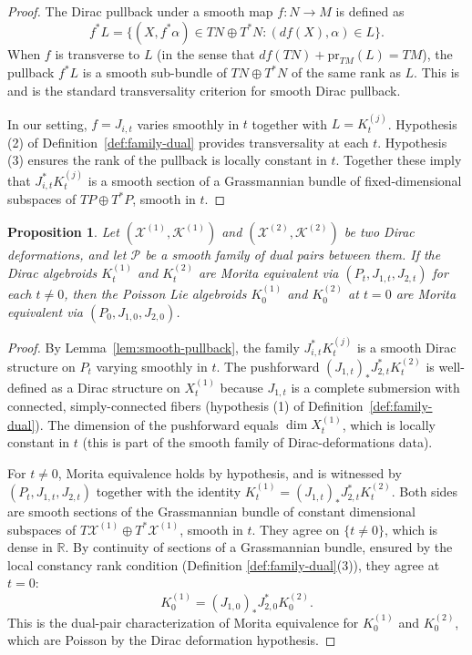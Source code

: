 \documentclass[reqno]{amsart}
\theoremstyle{plain}
\newtheorem{Prop}[Thm]{Proposition}
\theoremstyle{definition}
\newcommand{\R}{\mathbb{R}}
\newcommand{\X}{\mathcal{X}}
\newcommand{\K}{\mathcal{K}}
\newcommand{\PP}{\mathcal{P}}
\begin{document}
\begin{proof}
The Dirac pullback under a smooth map $f \colon N \to M$ is defined as
\[
  f^* L = \{ (X, f^* \alpha) \in TN \oplus T^*N : (df(X), \alpha) \in L \}.
\]
When $f$ is transverse to $L$ (in the sense that $df(TN) + \mathrm{pr}_{TM}(L) = TM$), the pullback $f^*L$ is a smooth sub-bundle of $TN \oplus T^*N$ of the same rank as $L$. This is \cite[Proposition 5.6]{bursztyn2013brief} and is the standard transversality criterion for smooth Dirac pullback.
 
In our setting, $f = J_{i,t}$ varies smoothly in $t$ together with $L = K_t^{(j)}$. Hypothesis (2) of Definition~\ref{def:family-dual} provides transversality at each $t$. Hypothesis (3) ensures the rank of the pullback is locally constant in $t$. Together these imply that $J_{i,t}^* K_t^{(j)}$ is a smooth section of a Grassmannian bundle of fixed-dimensional subspaces of $TP \oplus T^*P$, smooth in $t$.
\end{proof}
 
\begin{Prop}\label{prop:morita-LA}
Let $(\X^{(1)}, \K^{(1)})$ and $(\X^{(2)}, \K^{(2)})$ be two Dirac deformations, and let $\PP$ be a smooth family of dual pairs between them. If the Dirac algebroids $K_t^{(1)}$ and $K_t^{(2)}$ are Morita equivalent via $(P_t, J_{1,t}, J_{2,t})$ for each $t \neq 0$, then the Poisson Lie algebroids $K_0^{(1)}$ and $K_0^{(2)}$ at $t = 0$ are Morita equivalent via $(P_0, J_{1,0}, J_{2,0})$.
\end{Prop}
 
\begin{proof}
By Lemma~\ref{lem:smooth-pullback}, the family $J_{i,t}^* K_t^{(j)}$ is a smooth Dirac structure on $P_t$ varying smoothly in $t$. The pushforward $(J_{1,t})_* J_{2,t}^* K_t^{(2)}$ is well-defined as a Dirac structure on $X_t^{(1)}$ because $J_{1,t}$ is a complete submersion with connected, simply-connected fibers (hypothesis (1) of Definition~\ref{def:family-dual}). The dimension of the pushforward equals $\dim X_t^{(1)}$, which is locally constant in $t$ (this is part of the smooth family of Dirac-deformations data).
 
For $t \neq 0$, Morita equivalence holds by hypothesis, and is witnessed by $(P_t, J_{1,t}, J_{2,t})$ together with the identity $K_t^{(1)} = (J_{1,t})_* J_{2,t}^* K_t^{(2)}$. Both sides are smooth sections of the Grassmannian bundle of constant dimensional subspaces of $T\X^{(1)} \oplus T^*\X^{(1)}$, smooth in $t$. They agree on $\{t \neq 0\}$, which is dense in $\R$. By continuity of sections of a Grassmannian bundle, ensured by the local constancy rank condition (Definition \ref{def:family-dual}(3)), they agree at $t = 0$:
\[
  K_0^{(1)} = (J_{1,0})_* J_{2,0}^* K_0^{(2)}.
\]
This is the dual-pair characterization of Morita equivalence for $K_0^{(1)}$ and $K_0^{(2)}$, which are Poisson by the Dirac deformation hypothesis.
\end{proof}
 
\end{document}
